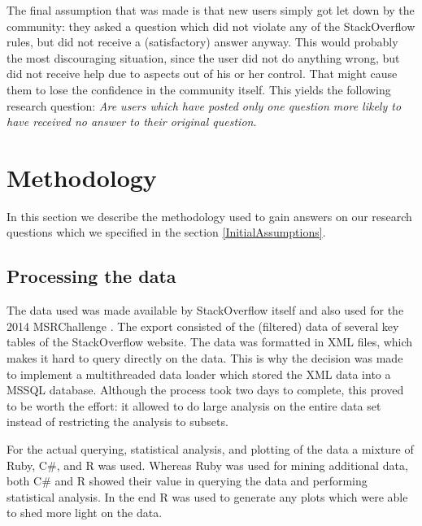 \documentclass[conference]{IEEEtran}
\begin{document}
The final assumption that was made is that new users simply got let down by the
community: they asked a question which did not violate any of the StackOverflow
rules, but did not receive a (satisfactory) answer anyway. This would probably
the most discouraging situation, since the user did not do anything wrong, but
did not receive help due to aspects out of his or her control. That might cause
them to lose the confidence in the community itself. This yields the following
research question: \textit{Are users which have posted only one question more
likely to have received no answer to their original question}. 

\section{Methodology} \label{Methodology}

In this section we describe the methodology used to gain answers on our
research questions which we specified in the section \ref{InitialAssumptions}.

\subsection{Processing the data}

The data used was made available by StackOverflow itself and also used for the
2014 MSRChallenge \cite{MSRChallenge2015}. The export consisted of the
(filtered) data of several key tables of the StackOverflow website. The data
was formatted in XML files, which makes it hard to query directly on the data.
This is why the decision was made to implement a multithreaded data loader
which stored the XML data into a MSSQL database. Although the process took two
days to complete, this proved to be worth the effort: it allowed to do large
analysis on the entire data set instead of restricting the analysis to subsets.

For the actual querying, statistical analysis, and plotting of the data a
mixture of Ruby, C\#, and R was used. Whereas Ruby was used for mining
additional data,  both C\# and R showed their value in querying the data and
performing statistical analysis. In the end R was used to generate any plots
which were able to shed more light on the data.
\end{document}
